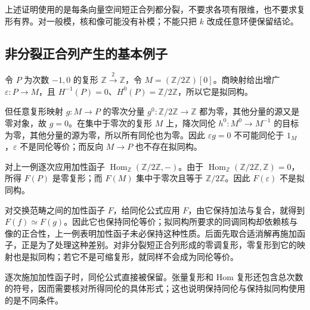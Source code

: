 上述证明使用的是每条向量空间短正合列都分裂，不要求各项有限维，也不要求复形有界。对一般模，核和像可能没有补模；不能只把 \(k\) 改成任意环便保留结论。

\subsection{非分裂正合列产生的基本例子}
\label{b4:subsec:0603:03}

\begin{example}\label{b4:exm:resolution-quasi-not-homotopy}
	令 \(P\) 为次数 \(-1,0\) 的复形 \(\mathbb Z\xrightarrow{2}\mathbb Z\)，令 \(M=(\mathbb Z/2\mathbb Z)[0]\)。商映射给出增广 \(\varepsilon:P\to M\)，且 \(H^{-1}(P)=0\)、\(H^0(P)=\mathbb Z/2\mathbb Z\)，所以它是拟同构。

	\ProseParagraphBreak
	但任意复形映射 \(g:M\to P\) 的零次分量 \(g^0:\mathbb Z/2\mathbb Z\to\mathbb Z\) 都为零，其他分量的源又是零对象，故 \(g=0\)。在集中于零次的复形 \(M\) 上，降次同伦 \(h^0:M^0\to M^{-1}\) 的目标为零，其他分量的源为零，所以所有同伦也为零。因此 \(\varepsilon g=0\) 不可能同伦于 \(1_M\)，\(\varepsilon\) 不是同伦等价；而反向 \(M\to P\) 也不存在拟同构。
\end{example}

\begin{example}\label{b4:exm:additive-not-quasi-preserving}
	对上一例逐次应用加性函子 \(\operatorname{Hom}_{\mathbb Z}(\mathbb Z/2\mathbb Z,-)\)。由于 \(\operatorname{Hom}_{\mathbb Z}(\mathbb Z/2\mathbb Z,\mathbb Z)=0\)，所得 \(F(P)\) 是零复形；而 \(F(M)\) 集中于零次且等于 \(\mathbb Z/2\mathbb Z\)。因此 \(F(\varepsilon)\) 不是拟同构。
\end{example}

对交换范畴之间的加性函子 \(F\)，给同伦公式应用 \(F\)，由它保持加法与复合，就得到 \(F(f)\simeq F(g)\)。因此它也保持同伦等价；拟同构所要求的同调同构却依赖核与像的正合性，上一例表明加性函子未必保持这种性质。后面先取合适消解再施加函子，正是为了处理这种差别。对非分裂短正合列形成的零调复形，零复形到它的映射也是拟同构；若它不是可缩复形，就同样不会成为同伦等价。

\ProseParagraphBreak
逐次施加加性函子时，同伦公式直接被保留。张量复形和 Hom 复形还包含总次数的符号，因而需要核对所得同伦的具体形式；这也说明保持同伦与保持拟同构使用的是不同条件。

